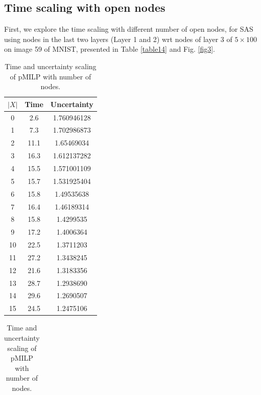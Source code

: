 \subsection*{Time scaling with open nodes}	

First, we explore the time scaling with different number of open nodes, for SAS using nodes in the last two layers (Layer 1 and 2) wrt nodes of layer 3 of $5\times 100$ on image 59 of MNIST, presented in Table \ref{table14} and Fig. \ref{fig3}.





\begin{table}[t!]
	 \caption{Time and uncertainty scaling of pMILP with number of nodes.}
		\centering
		\hspace*{4ex}
		\begin{subtable}[b]{0.45\textwidth}
		\begin{tabular}{|c|c|c|}
		\hline
		$|X|$ & Time & Uncertainty\\ 
		\hline	0 & 2.6 & 1.760946128\\
		\hline	1 & 7.3 & 1.702986873\\
		\hline	2 & 11.1 & 1.65469034\\
		\hline	3 & 16.3 & 1.612137282\\
		\hline	4 & 15.5 & 1.571001109\\
		\hline	5 & 15.7 & 1.531925404\\
		\hline	6 & 15.8 & 1.49535638\\
		\hline	7 & 16.4 & 1.46189314\\
		\hline	8 &  15.8 & 1.4299535\\
		\hline	9 &  17.2 & 1.4006364\\
		\hline	10 & 22.5 & 1.3711203\\
		\hline	11 & 27.2 & 1.3438245\\
		\hline	12 & 21.6 & 1.3183356\\
		\hline	13 & 28.7 & 1.2938690\\
		\hline	14 & 29.6 & 1.2690507\\
		\hline	15 & 24.5 & 1.2475106\\
		\hline
	  \end{tabular}
	\end{subtable}
	\hfill
	\begin{subtable}[b]{0.45\textwidth}
		\begin{tabular}{|c|c|c|}

\end{tabular}
\end{subtable}
\end{table}
